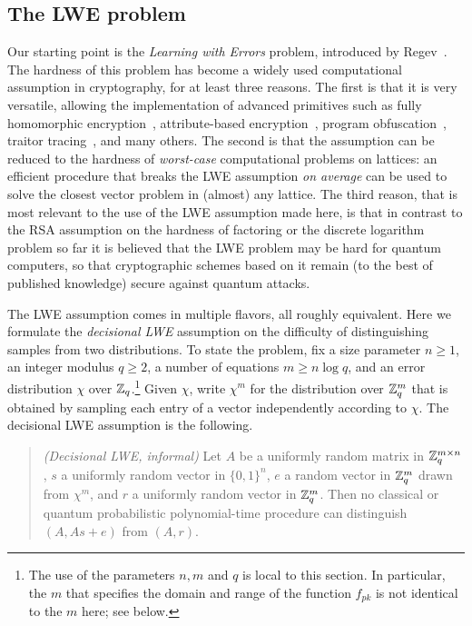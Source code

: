 \subsection{The LWE problem}

Our starting point is the \emph{Learning with Errors} problem, introduced by Regev~\cite{regev2009lattices}. The hardness of this problem has become a widely used computational assumption in cryptography, for at least three reasons. The first is that it is very versatile, allowing the implementation of advanced primitives such as fully homomorphic encryption~\cite{gentry2009fully,brakerski2014efficient}, attribute-based encryption~\cite{gorbunov2015attribute}, program obfuscation~\cite{wichs2017obfuscating,goyal2017lockable}, traitor tracing~\cite{goyal2018collusion}, and many others. The second is that the assumption can be reduced to the hardness of \emph{worst-case} computational problems on lattices: an efficient procedure that breaks the LWE assumption \emph{on average} can be used to solve the closest vector problem in (almost) {any} lattice. The third reason, that is most relevant to the use of the LWE assumption made here, is that in contrast to the RSA assumption on the hardness of factoring or the discrete logarithm problem so far it is believed that the LWE problem may be hard for quantum computers, so that cryptographic schemes based on it remain (to the best of published knowledge) secure against quantum attacks. 

The LWE assumption comes in multiple flavors, all roughly equivalent. Here we formulate the \emph{decisional LWE} assumption on the difficulty of distinguishing samples from two distributions. To state the problem, fix a size parameter $n\geq 1$, an integer modulus $q\geq 2$, a number of equations $m\geq n\log q$, and an error distribution $\chi$ over $\mathbb{Z}_q$.\footnote{The use of the parameters $n,m$ and $q$ is local to this section. In particular, the $m$ that specifies the domain and range of the function $f_{pk}$ is not identical to the $m$ here; see below.} Given $\chi$, write $\chi^m$ for the distribution over $\mathbb{Z}_q^m$ that is obtained by sampling each entry of a vector independently according to $\chi$. The decisional LWE assumption is the following.

\begin{quote}\emph{(Decisional LWE, informal)} Let $A$ be a uniformly random matrix in $\mathbb{Z}_q^{m\times n}$, $s$ a uniformly random vector in $\{0,1\}^n$, $e$ a random vector in $\mathbb{Z}_q^m$ drawn from $\chi^m$, and $r$ a uniformly random vector in $\mathbb{Z}_q^m$. Then no classical or quantum probabilistic polynomial-time procedure can distinguish  $(A,As+e)$ from $(A,r)$.
\end{quote}

